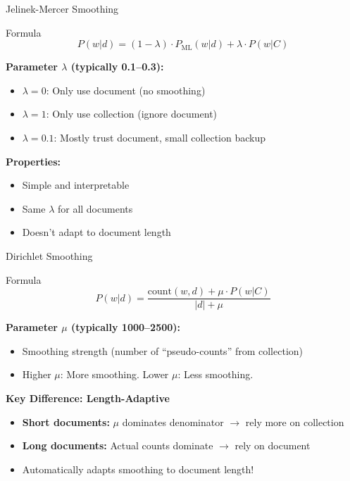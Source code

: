 \documentclass[aspectratio=169]{beamer}
\newif\ifanimated
\newcommand{\cpause}{\ifanimated\pause\fi}
\begin{document}
\begin{frame}[shrink=5]{Jelinek-Mercer Smoothing}
\begin{block}{Formula}
$$P(w|d) = (1-\lambda) \cdot P_{\text{ML}}(w|d) + \lambda \cdot P(w|C)$$
\end{block}

\textbf{Parameter $\lambda$ (typically 0.1--0.3):}
\begin{itemize}
    \item $\lambda = 0$: Only use document (no smoothing)
    \item $\lambda = 1$: Only use collection (ignore document)
    \item $\lambda = 0.1$: Mostly trust document, small collection backup
\end{itemize}\cpause

\vspace{1em}
\cpause
\textbf{Properties:}
\begin{itemize}
    \item \textcolor{green}{\checkmark} Simple and interpretable
    \item \textcolor{green}{\checkmark} Same $\lambda$ for all documents
    \item \textcolor{red}{} Doesn't adapt to document length
\end{itemize}
\end{frame}

\begin{frame}{Dirichlet Smoothing}
\begin{block}{Formula}
$$P(w|d) = \frac{\text{count}(w,d) + \mu \cdot P(w|C)}{|d| + \mu}$$
\end{block}

\textbf{Parameter $\mu$ (typically 1000--2500):}
\begin{itemize}
    \item Smoothing strength (number of ``pseudo-counts'' from collection)
    \item Higher $\mu$: More smoothing. Lower $\mu$: Less smoothing.
\end{itemize}\cpause

\vspace{1em}

\textbf{Key Difference: Length-Adaptive}
\begin{itemize}
    \item \textbf{Short documents:} $\mu$ dominates denominator $\rightarrow$ rely more on collection
    \item \textbf{Long documents:} Actual counts dominate $\rightarrow$ rely on document
    \item Automatically adapts smoothing to document length!
\end{itemize}\cpause
\end{frame}
\end{document}
